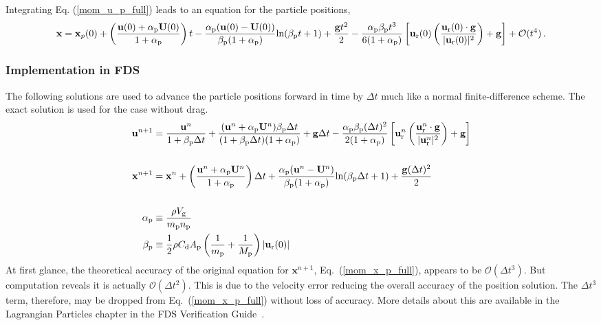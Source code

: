 Integrating Eq. (\ref{mom_u_p_full}) leads to an equation for the particle positions,
\begin{align}
    \label{mom_x_p_full}
    \mathbf{x} = \mathbf{x}_{p}(0) + \left(\frac{\mathbf{u}(0) + \alpha_{\rm p} \mathbf{U}(0)}{1 + \alpha_{\rm p}}\right) t - \frac{\alpha_{\rm p} (\mathbf{u}(0) - \mathbf{U}(0))}{\beta_{\rm p} (1 + \alpha_{\rm p})} \text{ln}(\beta_{\rm p} t + 1) + \frac{\mathbf{g} t^2}{2} - \frac{\alpha_{\rm p} \beta_{\rm p} t^3}{6 (1 + \alpha_{\rm p})} \left[\mathbf{u}_{\text{r}}(0) \left(\frac{\mathbf{u}_{\text{r}}(0) \cdot \mathbf{g}}{|\mathbf{u}_{\text{r}}(0)|^2}\right) + \mathbf{g}\right] + \mathcal{O}(t^4) \,.
\end{align}

\subsubsection*{Implementation in FDS}

The following solutions are used to advance the particle positions forward in time by $\Delta t$ much like a normal finite-difference scheme. The exact solution is used for the case without drag.
\begin{align}
    \mathbf{u}^{n+1} &= \frac{\mathbf{u}^n}{1 + \beta_{\rm p} \Delta t} + \frac{(\mathbf{u}^n + \alpha_{\rm p} \mathbf{U}^n)\beta_{\rm p} \Delta t}{(1 + \beta_{\rm p} \Delta t)(1 + \alpha_{\rm p})} + \mathbf{g} \Delta t - \frac{\alpha_{\rm p} \beta_{\rm p} (\Delta t)^2}{2 (1 + \alpha_{\rm p})} \left[\mathbf{u}_\text{r}^n \left(\frac{\mathbf{u}_\text{r}^n \cdot \mathbf{g}}{|\mathbf{u}_\text{r}^n|^2}\right) + \mathbf{g}\right] \\
    & \notag \\
    \mathbf{x}^{n+1} &= \mathbf{x}^n + \left(\frac{\mathbf{u}^n + \alpha_{\rm p} \mathbf{U}^n}{1 + \alpha_{\rm p}}\right) \Delta t + \frac{\alpha_{\rm p} (\mathbf{u}^n - \mathbf{U}^n)}{\beta_{\rm p} (1 + \alpha_{\rm p})} \text{ln}(\beta_{\rm p} \Delta t + 1) + \frac{\mathbf{g} (\Delta t)^2}{2} \\
    & \notag \\
    \alpha_{\rm p} &\equiv \frac{\rho V_{\rm g}}{m_{\rm p} n_{\rm p}} \notag \\
    \beta_{\rm p} &\equiv \frac{1}{2} \rho C_\text{d} A_{\rm p} \left(\frac{1}{m_{\rm p}} + \frac{1}{M_{\rm p}} \right) |\mathbf{u}_{\text{r}}(0)| \notag
\end{align}
At first glance, the theoretical accuracy of the original equation for $\mathbf{x}^{n+1}$, Eq.~(\ref{mom_x_p_full}), appears to be $\mathcal{O}(\Delta t^3)$. But computation reveals it is actually $\mathcal{O}(\Delta t^2)$. This is due to the velocity error reducing the overall accuracy of the position solution. The $\Delta t^3$ term, therefore, may be dropped from Eq.~(\ref{mom_x_p_full}) without loss of accuracy. More details about this are available in the Lagrangian Particles chapter in the FDS Verification Guide~\cite{FDS_Verification_Guide}.



